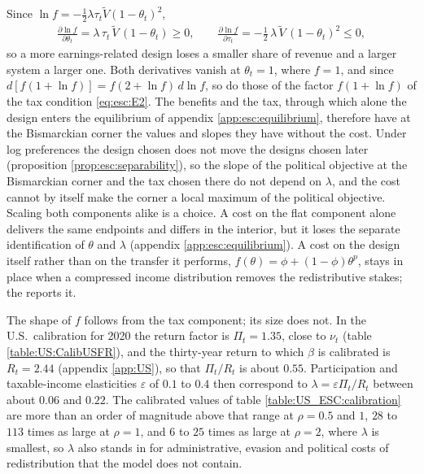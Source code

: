  Since $\ln f = -\frac{1}{2}\lambda\tau_t\tilde{V}(1-\theta_t)^2$,
\begin{align*}
    \frac{\partial\ln f}{\partial\theta_t} = \lambda\,\tau_t\,\tilde{V}\,(1-\theta_t) \geq 0, \qquad \frac{\partial\ln f}{\partial\tau_t} = -\frac{1}{2}\,\lambda\,\tilde{V}\,(1-\theta_t)^2 \leq 0,
\end{align*}
so a more earnings-related design loses a smaller share of revenue and a larger system a larger one. Both derivatives vanish at $\theta_t = 1$, where $f = 1$, and since $d\left[f(1+\ln f)\right] = f(2+\ln f)\,d\ln f$, so do those of the factor $f(1+\ln f)$ of the tax condition \eqref{eq:esc:E2}. The benefits and the tax, through which alone the design enters the equilibrium of appendix \ref{app:esc:equilibrium}, therefore have at the Bismarckian corner the values and slopes they have without the cost. Under log preferences the design chosen does not move the designs chosen later (proposition \ref{prop:esc:separability}), so the slope of the political objective at the Bismarckian corner and the tax chosen there do not depend on $\lambda$, and the cost cannot by itself make the corner a local maximum of the political objective. Scaling both components alike is a choice. A cost on the flat component alone delivers the same endpoints and differs in the interior, but it loses the separate identification of $\theta$ and $\lambda$ (appendix \ref{app:esc:equilibrium}). A cost on the design itself rather than on the transfer it performs, $f(\theta) = \phi + (1-\phi)\theta^{p}$, stays in place when a compressed income distribution removes the redistributive stakes; the  reports it.

 The shape of $f$ follows from the tax component; its size does not. In the U.S.\ calibration for 2020 the return factor is $\Pi_t = 1.35$, close to $\nu_t$ (table \ref{table:US:CalibUSFR}), and the thirty-year return to which $\beta$ is calibrated is $R_t = 2.44$ (appendix \ref{app:US}), so that $\Pi_t/R_t$ is about $0.55$. Participation and taxable-income elasticities $\varepsilon$ of $0.1$ to $0.4$ \parencite{ChettyGMW11a1,SaezSG12a1} then correspond to $\lambda = \varepsilon\Pi_t/R_t$ between about $0.06$ and $0.22$. The calibrated values of table \ref{table:US_ESC:calibration} are more than an order of magnitude above that range at $\rho = 0.5$ and $1$, $28$ to $113$ times as large at $\rho = 1$, and $6$ to $25$ times as large at $\rho = 2$, where $\lambda$ is smallest, so $\lambda$ also stands in for administrative, evasion and political costs of redistribution that the model does not contain.

